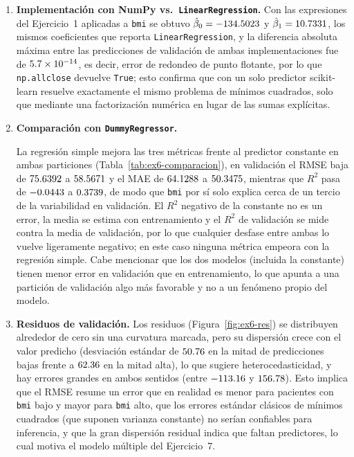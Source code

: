 \begin{enumerate}
\item \textbf{Implementación con NumPy vs.\ \texttt{LinearRegression}.}
Con las expresiones del Ejercicio~1 aplicadas a \texttt{bmi} se obtuvo
$\hat\beta_0 = -134.5023$ y $\hat\beta_1 = 10.7331$, los mismos
coeficientes que reporta \texttt{LinearRegression}, y la diferencia absoluta
máxima entre las predicciones de validación de ambas implementaciones fue de
$5.7\times 10^{-14}$, es decir, error de redondeo de punto flotante, por lo que
\texttt{np.allclose} devuelve \texttt{True}; esto confirma que con un solo
predictor scikit-learn resuelve exactamente el mismo problema de mínimos
cuadrados, solo que mediante una factorización numérica en lugar de las sumas
explícitas.

\item \textbf{Comparación con \texttt{DummyRegressor}.}

\begin{table}[H]
\centering
\small

\caption{Predictor constante frente a regresión simple (entrenamiento y validación).}
\label{tab:ex6-comparacion}
\end{table}

La regresión simple mejora las tres métricas frente al predictor constante en
ambas particiones (Tabla~\ref{tab:ex6-comparacion}), en validación el RMSE
baja de $75.6392$ a $58.5671$ y el MAE de
$64.1288$ a $50.3475$, mientras que $R^2$ pasa de
$-0.0443$ a $0.3739$, de modo que \texttt{bmi} por sí
solo explica cerca de un tercio de la variabilidad en validación. El $R^2$
negativo de la constante no es un error, la media se estima con entrenamiento
y el $R^2$ de validación se mide contra la media de validación, por lo que
cualquier desfase entre ambas lo vuelve ligeramente negativo; en este caso
ninguna métrica empeora con la regresión simple. Cabe mencionar que los dos
modelos (incluida la constante) tienen menor error en validación que en
entrenamiento, lo que apunta a una partición de validación algo más
favorable y no a un fenómeno propio del modelo.

\item \textbf{Residuos de validación.}
Los residuos (Figura~\ref{fig:ex6-res}) se distribuyen alrededor de cero sin
una curvatura marcada, pero su dispersión crece con el valor predicho
(desviación estándar de $50.76$ en la mitad de predicciones bajas
frente a $62.36$ en la mitad alta), lo que sugiere heterocedasticidad,
y hay errores grandes en ambos sentidos (entre $-113.16$ y $156.78$). Esto
implica que el RMSE resume un error que en realidad es menor para pacientes
con \texttt{bmi} bajo y mayor para \texttt{bmi} alto, que los errores
estándar clásicos de mínimos cuadrados (que suponen varianza constante) no
serían confiables para inferencia, y que la gran dispersión residual indica
que faltan predictores, lo cual motiva el modelo múltiple del Ejercicio~7.


\end{enumerate}
